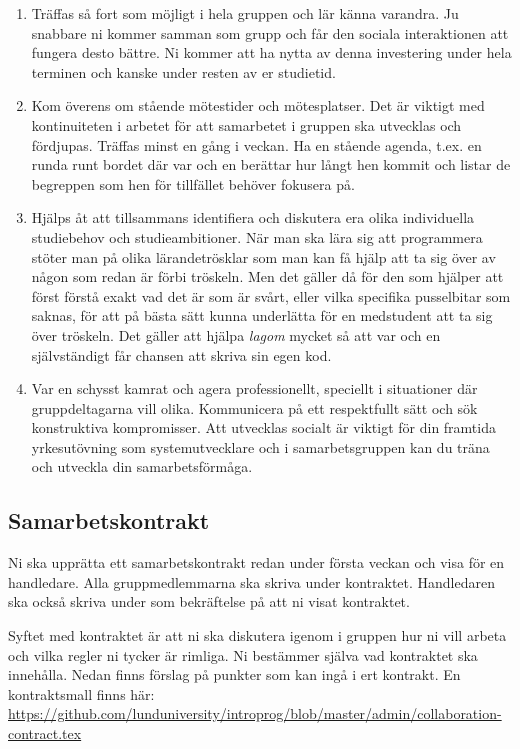 \begin{enumerate}
\item Träffas så fort som möjligt i hela gruppen och lär känna varandra. Ju snabbare ni kommer samman som grupp och får den sociala interaktionen att fungera desto bättre. Ni kommer att ha nytta av denna investering under hela terminen och kanske under resten av er studietid.
\item Kom överens om stående mötestider och mötesplatser. Det är viktigt med kontinuiteten i arbetet för att samarbetet i gruppen ska utvecklas och fördjupas. Träffas minst en gång i veckan. Ha en stående agenda, t.ex. en runda runt bordet där var och en berättar hur långt hen kommit och listar de begreppen som hen för tillfället behöver fokusera på.
\item Hjälps åt att tillsammans identifiera och diskutera era olika individuella studiebehov och studieambitioner. När man ska lära sig att programmera stöter man på olika lärandetrösklar som man kan få hjälp att ta sig över av någon som redan är förbi tröskeln. Men det gäller då för den som hjälper att först förstå exakt vad det är som är svårt, eller vilka specifika pusselbitar som saknas, för att på bästa sätt kunna underlätta för en medstudent att ta sig över tröskeln. Det gäller att hjälpa \emph{lagom} mycket så att var och en självständigt får chansen att skriva sin egen kod.
\item Var en schysst kamrat och agera professionellt, speciellt i situationer där gruppdeltagarna vill olika. Kommunicera på ett respektfullt sätt och sök konstruktiva kompromisser. Att utvecklas socialt är viktigt för din framtida yrkesutövning som systemutvecklare och i samarbetsgruppen kan du träna och utveckla din samarbetsförmåga.
\end{enumerate}

\subsection{Samarbetskontrakt}

Ni ska upprätta ett samarbetskontrakt redan under första veckan och visa för en handledare. Alla gruppmedlemmarna ska skriva under kontraktet. Handledaren ska också skriva under som bekräftelse på att ni visat kontraktet.

Syftet med kontraktet är att ni ska diskutera igenom i gruppen hur ni vill arbeta och vilka regler ni tycker är rimliga. Ni bestämmer själva vad kontraktet ska innehålla. Nedan finns förslag på punkter som kan ingå i ert kontrakt. En kontraktsmall finns här: \url{https://github.com/lunduniversity/introprog/blob/master/admin/collaboration-contract.tex}

